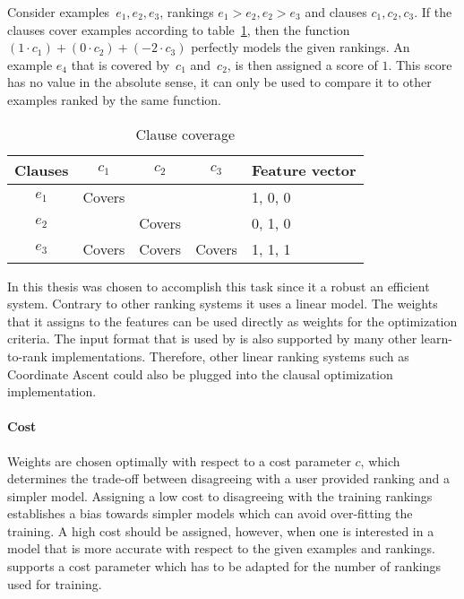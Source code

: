 \begin{example}
	Consider examples~$e_1, e_2, e_3$, rankings $e_1 > e_2, e_2 > e_3$ and clauses $c_1, c_2, c_3$.
	If the clauses cover examples according to table~\ref{tbl:cover_examples}, then the function $(1 \cdot c_1) + (0\cdot c_2) + (-2\cdot c_3)$ perfectly models the given rankings.
	An example $e_4$ that is covered by~$c_1$ and~$c_2$, is then assigned a score of $1$.
	This score has no value in the absolute sense, it can only be used to compare it to other examples ranked by the same function.

	\begin{table}[!htp]
	\label{tbl:cover_examples}
	\begin{tabularx}{\textwidth}{c|ccc|X}
		\textbf{Clauses}	&$c_1$  	& $c_2$ 	& $c_3$ 	& \textbf{Feature vector}\\
		\toprule
		$e_1$ 				& Covers 	&  			&  			& 1, 0, 0\\
		$e_2$ 				& 			& Covers	&  			& 0, 1, 0\\
		$e_3$ 				& Covers 	& Covers 	& Covers 	& 1, 1, 1\\
	\end{tabularx}
	\caption{Clause coverage}
	\end{table}

\end{example}

In this thesis \svm{} was chosen to accomplish this task since it a robust an efficient system.
Contrary to other ranking systems it uses a linear model.
The weights that it assigns to the features can be used directly as weights for the optimization criteria.
The input format that is used by \svm{} is also supported by many other learn-to-rank implementations.
Therefore, other linear ranking systems such as Coordinate Ascent \cite{metzler2007linear} could also be plugged into the clausal optimization implementation.

\paragraph{Cost}
Weights are chosen optimally with respect to a cost parameter $c$, which determines the trade-off between disagreeing with a user provided ranking and a simpler model.
Assigning a low cost to disagreeing with the training rankings establishes a bias towards simpler models which can avoid over-fitting the training.
A high cost should be assigned, however, when one is interested in a model that is more accurate with respect to the given examples and rankings.
\svm{} supports a cost parameter which has to be adapted for the number of rankings used for training.

